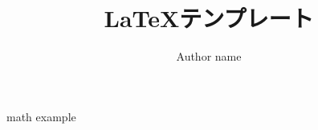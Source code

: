 \documentclass[a4paper,11pt]{ltjreport}
\title{\LaTeX テンプレート}
\author{Author name}
\date{\the\year}
\begin{document}
\maketitle

{math}
{example}
\end{document}
